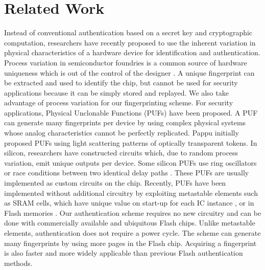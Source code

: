 \section{Related Work}

Instead of conventional authentication based on a secret key and cryptographic computation, researchers have recently proposed to use the inherent variation in physical characteristics of a hardware device for identification and authentication. Process variation in semiconductor foundries is a common source of hardware uniqueness which is out of the control of the designer \cite{boning1996statistical, bowman2002impact, nassif2000modeling}. A unique fingerprint can be extracted and used to identify the chip, but cannot be used for security applications because it can be simply stored and replayed. We also take advantage of process variation for our fingerprinting scheme. 
For security applications, Physical Unclonable Functions (PUFs) have been proposed. A PUF can generate many fingerprints per device by using complex physical systems whose analog characteristics cannot be perfectly replicated. Pappu initially proposed PUFs \cite{ravikanth2001physical} using light scattering patterns of optically transparent tokens. In silicon, researchers have constructed circuits which, due to random process variation, emit unique outputs per device. Some silicon PUFs use ring oscillators \cite{gassend2002silicon} or race conditions between two identical delay paths \cite{lee2004technique}. These PUFs are usually implemented as custom circuits on the chip. Recently, PUFs have been implemented without additional circuitry by exploiting metastable elements such as SRAM cells, which have unique value on start-up for each IC instance \cite{koeberl2011practical, holcomb2007initial}, or in Flash memories \cite{trust2011}. 
Our authentication scheme requires no new circuitry and can be done with commercially available and ubiquitous Flash chips. Unlike metastable elements, authentication does not require a power cycle. The scheme can generate many fingerprints by using more pages in the Flash chip. Acquiring a fingerprint is also faster and more widely applicable than previous Flash authentication methods.